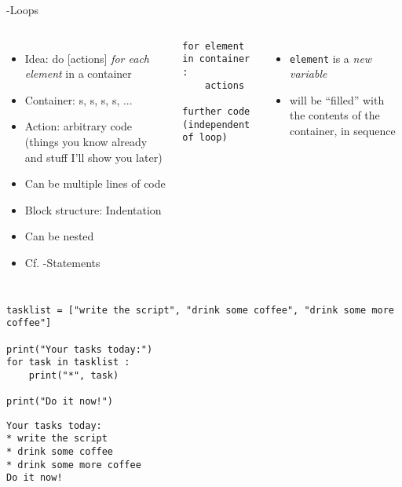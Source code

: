 \begin{frame}[fragile]{-Loops}
%
\begin{columns}[T]
\begin{itemize}
\item Idea: do [actions] \emph{for each element} in a container
\item Container: s, s, s, s, ...
\item Action: arbitrary code (things you know already and stuff I'll show you later)
\item Can be multiple lines of code
\item[\Thus] Block structure: Indentation
\item Can be nested
\item Cf. -Statements
\end{itemize}
%
\begin{codebox}
\begin{verbatim}
for element in container :
    actions

further code (independent of loop)
\end{verbatim}
\end{codebox}
%
\begin{itemize}
\item \texttt{element} is a \emph{new variable}
\item will be \enquote{filled} with the contents of the container, in sequence
\end{itemize}
\end{columns}
%
\end{frame}


\begin{frame}[fragile]
%
\begin{codebox}
\begin{verbatim}
tasklist = ["write the script", "drink some coffee", "drink some more coffee"]

print("Your tasks today:")
for task in tasklist :
    print("*", task)

print("Do it now!")
\end{verbatim}
\end{codebox}
%
\begin{cmdbox}
\begin{verbatim}
Your tasks today:
* write the script
* drink some coffee
* drink some more coffee
Do it now!
\end{verbatim}
\end{cmdbox}
%
\end{frame}

